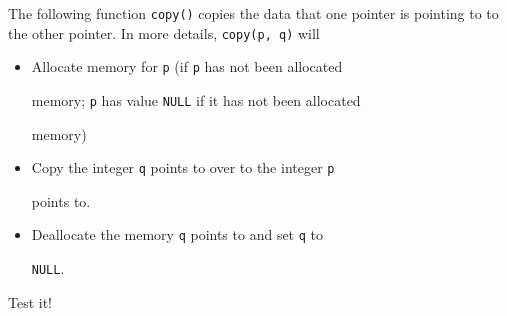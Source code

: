 The following function \texttt{copy()} copies the data that one pointer is pointing to to the other pointer. In more details, \texttt{copy(p, q)} will



\begin{itemize}

\item

  Allocate memory for \texttt{p} (if \texttt{p} has not been allocated

  memory; \texttt{p} has value \texttt{NULL} if it has not been allocated

  memory)

\item

  Copy the integer \texttt{q} points to over to the integer \texttt{p}

  points to.

\item

  Deallocate the memory \texttt{q} points to and set \texttt{q} to

  \texttt{NULL}.

\end{itemize}

  Test it!



